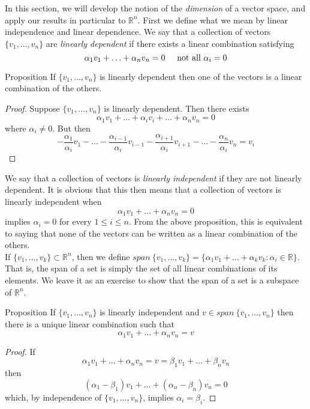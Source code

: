 In this section, we will develop the notion of the \emph{dimension} of a vector space, and apply our results in particular to \( \mathbb{R}^n \). First we define what we mean by linear independence and linear dependence. We say that a collection of vectors \( \{ v_1,\ldots, v_n \} \) are \emph{linearly dependent} if there exists a linear combination satisfying
\[
\alpha_1v_1+\ldots+\alpha_nv_n = 0 \hspace{5mm} \text{not all } \alpha_i = 0
\]
\begin{thm}{Proposition}
If \( \{ v_1,\ldots,v_n\} \) is linearly dependent then one of the vectors is a linear combination of the others.
\end{thm}
\begin{proof}
Suppose \( \{ v_1,\ldots,v_n\} \) is linearly dependent. Then there exists 
\[
\alpha_1v_1+\ldots+\alpha_iv_i+\ldots+\alpha_nv_n = 0
\]
where \( \alpha_i \neq 0 \). But then
\[
-\frac{\alpha_1}{\alpha_i}v_1 - \ldots - \frac{\alpha_{i-1}}{\alpha_i}v_{i-1} - \frac{\alpha_{i+1}}{\alpha_i}v_{i+1} - \ldots - \frac{\alpha_n}{\alpha_i}v_n = v_i
\]
\end{proof}
We say that a collection of vectors is \emph{linearly independent} if they are not linearly dependent. It is obvious that this then means that a collection of vectors is linearly independent when 
\[
\alpha_1v_1+\ldots+\alpha_nv_n = 0
\]
implies \( \alpha_i = 0 \) for every \( 1 \leq i \leq n \). From the above proposition, this is equivalent to saying that none of the vectors can be written as a linear combination of the others.
\\

If \( \{ v_1,\ldots,v_k \} \subset \mathbb{R}^n \), then we define \( span\: \{ v_1,\ldots,v_k \} = \{ \alpha_1v_1+\ldots+\alpha_kv_k : \alpha_i \in \mathbb{R} \} \). That is, the span of a set is simply the set of all linear combinations of its elements. We leave it as an exercise to show that the span of a set is a subspace of \( \mathbb{R}^n \). 

\begin{thm}{Proposition}
    If \( \{ v_1,\ldots,v_n\} \) is linearly independent and \( v \in span \: \{v_1,\ldots,v_n\} \) then there is a unique linear combination such that
    \[
    \alpha_1v_1+\ldots+\alpha_nv_n = v
    \]
\end{thm}

\begin{proof}
If
\[
\alpha_1v_1+\ldots+\alpha_nv_n = v = \beta_1v_1+\ldots+\beta_nv_n
\]
then
\[
(\alpha_1-\beta_1)v_1+\ldots+(\alpha_n-\beta_n)v_n = 0
\]
which, by independence of \( \{v_1,\ldots,v_n\} \), implies \( \alpha_i=\beta_i \).
\end{proof}

